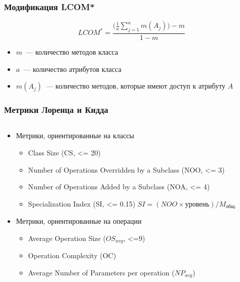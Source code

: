\documentclass{../../slides-style}
\begin{document}
    \begin{frame}
        \frametitle{Модификация LCOM*}
        
        $$LCOM^* = \frac{\Biggl(\frac{1}{a}\sum\limits_{j=1}^{a}m(A_j)\Biggr) - m}{1 - m}$$

        \begin{itemize}
            \item $m$~--- количество методов класса
            \item $a$~--- количество атрибутов класса
            \item $m(A_j)$~--- количество методов, которые имеют доступ к атрибуту $A$
        \end{itemize}
    \end{frame}

    \begin{frame}
        \frametitle{Метрики Лоренца и Кидда}
        \begin{columns}
            \begin{column}{0.65\textwidth}
                \begin{itemize}
                    \item Метрики, ориентированные на классы
                    \begin{itemize}
                        \item Class Size (CS, <= 20)
                        \item Number of Operations Overridden by a Subclass (NOO, <= 3)
                        \item Number of Operations Added by a Subclass (NOA, <= 4)
                        \item Specialization Index (SI, <= 0.15)
                            $SI = (NOO \times \text{уровень}) / M_\text{общ.}$
                    \end{itemize}
                    \item Метрики, ориентированные на операции
                    \begin{itemize}
                        \item Average Operation Size ($OS_{avg}$, <=9)
                        \item Operation Complexity (OC)
                        \item Average Number of Parameters per operation ($NP_{avg}$)
                    \end{itemize}
                \end{itemize}
            \end{column}

\end{columns}
\end{frame}
\end{document}
